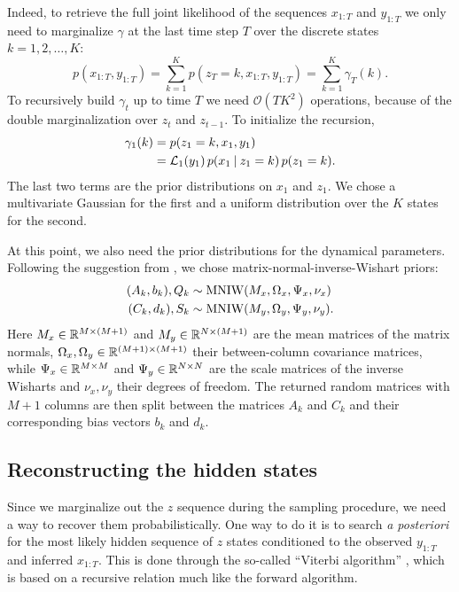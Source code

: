 \documentclass[
  10pt, twocolumn, headings=normal,
  footlines=1, DIV=calc
]{scrartcl}
\begin{document}
Indeed, to retrieve the full joint likelihood of the sequences $x_{1:T}$ and
$y_{1:T}$ we only need to marginalize $\gamma$ at the last time step $T$ over
the discrete states $k = 1, 2, \ldots, K$:
\begin{equation}
  p(x_{1:T}, y_{1:T}) = \sum_{k=1}^{K} p(z_{T} = k, x_{1:T}, y_{1:T})
    = \sum_{k=1}^{K} \gamma_{T} (k).
\end{equation}
To recursively build $\gamma_{t}$ up to time $T$ we need
$\mathcal{O}(TK^{2})$ operations, because of the double marginalization over
$z_{t}$ and $z_{t-1}$. To initialize the recursion,
\begin{equation}
  \begin{split}
    \gamma_{1}(k) &= p(z_{1} = k, x_{1}, y_{1}) \\
                  &= \mathcal{L}_{1}(y_{1}) \,
                    p(x_{1} \:\vert\: z_{1} = k) \, p(z_{1} = k).
  \end{split}
  \label{eq:gamma-1}
\end{equation}
The last two terms are the prior distributions on $x_{1}$ and $z_{1}$. We chose
a multivariate Gaussian for the first and a uniform distribution over the $K$
states for the second. 

At this point, we also need the prior distributions for the dynamical
parameters. Following the suggestion from \textcite{Linderman17}, we chose
matrix-normal-inverse-Wishart priors:
\begin{align}
  (A_{k}, b_{k}), Q_{k} &\sim \operatorname{MNIW}(M_{x}, \Omega_{x}, \Psi_{x}, \nu_{x}) \\
  (C_{k}, d_{k}), S_{k} &\sim \operatorname{MNIW}(M_{y}, \Omega_{y}, \Psi_{y}, \nu_{y}).
\end{align}
Here $M_{x} \in \mathbb{R}^{M \times (M + 1)}$ and $M_{y} \in \mathbb{R}^{N \times (M + 1)}$ are
the mean ma\-tri\-ces of the matrix normals, $\Omega_x, \Omega_y \in \mathbb{R}^{(M + 1)
\times (M + 1)}$ their be\-tween-column covariance matrices, while $\Psi_x \in
\mathbb{R}^{M \times M}$ and $\Psi_{y} \in \mathbb{R}^{N \times N}$ are the scale matrices of
the inverse Wisharts and $\nu_{x}, \nu_{y}$ their degrees of freedom. The
returned random matrices with $M + 1$ columns are then split between the
matrices $A_{k}$ and $C_{k}$ and their corresponding bias vectors $b_{k}$ and
$d_{k}$.

\subsection{Reconstructing the hidden states}
Since we marginalize out the $z$ sequence during the sampling procedure, we need
a way to recover them probabilistically. One way to do it is to search \emph{a
posteriori} for the most likely hidden sequence of $z$ states conditioned to the
observed $y_{1:T}$ and inferred $x_{1:T}$. This is done through the so-called
\enquote{Viterbi algorithm} \autocite{Stan24}, which is based on a recursive
relation much like the forward algorithm.
\end{document}
